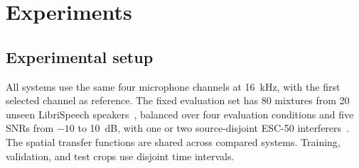 \documentclass{article}
\begin{document}
\section{Experiments}
\begin{table}[t]
\centering
\caption{Comparison on the fixed four-microphone evaluation set. Learned quality scores report mean $\pm$ sample standard deviation over three runs. Runtimes are medians for a 4-s input (Sec.~\ref{sec:comparison}); dashes denote no timing test.}
\label{tab:main}
\setlength{\tabcolsep}{3.8pt}
\end{table}

\subsection{Experimental setup}
All systems use the same four microphone channels at 16~kHz, with the first selected channel as reference. The fixed evaluation set has 80 mixtures from 20 unseen LibriSpeech speakers~\cite{panayotov2015librispeech}, balanced over four evaluation conditions and five SNRs from $-10$ to 10~dB, with one or two source-disjoint ESC-50 interferers~\cite{piczak2015esc50}. The spatial transfer functions are shared across compared systems. Training, validation, and test crops use disjoint time intervals.
\end{document}
